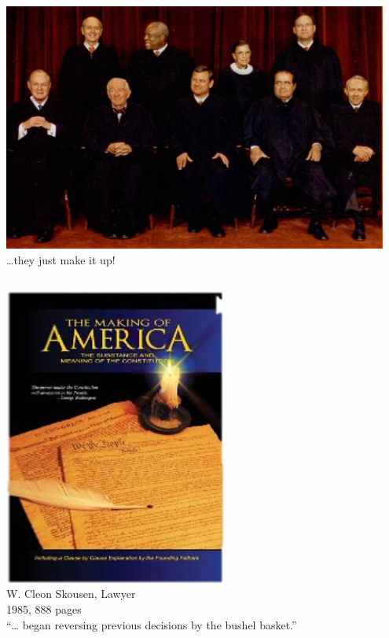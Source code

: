 \begin{frame}
    \centering
    \includegraphics[width=0.95\textwidth]{img/thomas-breyer.jpg} \\
    \pause
    { \large \ldots they just make it up! } \\
\end{frame}

\begin{frame}
    \begin{columns}[onlytextwidth]
            \centering
            \includegraphics[width=0.75\textwidth]{img/making-of-america.png} \\
            W. Cleon Skousen, Lawyer \\
            1985, 888 pages \\

            ``\ldots {} began reversing previous decisions by the bushel basket.''
    \end{columns}
\end{frame}

